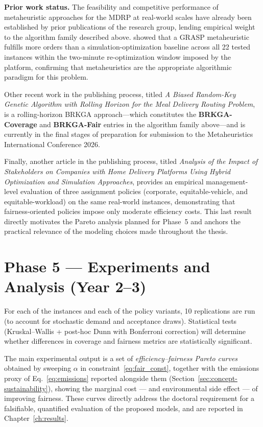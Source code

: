 \documentclass[12pt,a4paper]{report}
\begin{document}
\medskip
\noindent\textbf{Prior work status.} The feasibility and competitive performance of metaheuristic approaches for the MDRP at real-world scales have already been established by prior publications of the research group, lending empirical weight to the algorithm family described above. \citet{giraldo2024grasp} showed that a GRASP metaheuristic fulfills more orders than a simulation-optimization baseline across all 22 tested instances within the
two-minute re-optimization window imposed by the platform, confirming that metaheuristics are the appropriate algorithmic paradigm for this problem.

Other recent work in the publishing process, titled \emph{A Biased Random-Key Genetic Algorithm with Rolling Horizon for the Meal Delivery Routing Problem}, is a rolling-horizon BRKGA approach---which constitutes the \textbf{BRKGA-Coverage} and \textbf{BRKGA-Fair} entries in the algorithm family above---and is currently in the final stages of preparation for submission to the Metaheuristics International Conference 2026.

Finally, another article in the publishing process, titled \emph{Analysis of the Impact of Stakeholders on Companies with Home Delivery Platforms Using Hybrid Optimization and Simulation Approaches}, provides an empirical management-level evaluation of three assignment policies (corporate, equitable-vehicle, and equitable-workload) on the same real-world instances, demonstrating that fairness-oriented policies impose only moderate efficiency costs. This last result directly motivates the Pareto analysis planned for Phase~5 and anchors the practical relevance of the modeling choices made throughout the thesis.

\section{Phase 5 --- Experiments and Analysis (Year 2--3)}
\label{sec:phase5}

For each of the instances and each of the policy variants, 10 replications are run (to account for stochastic demand and acceptance draws). Statistical tests (Kruskal--Wallis + post-hoc Dunn with Bonferroni correction) will determine whether differences in coverage and fairness metrics are statistically significant.

The main experimental output is a set of \emph{efficiency--fairness Pareto curves} obtained by sweeping $\alpha$ in constraint~\eqref{eq:fair_const}, together with the emissions proxy of Eq.~\eqref{eq:emissions} reported alongside them (Section~\ref{sec:concept-sustainability}), showing the marginal cost --- and environmental side effect --- of improving fairness. These curves directly address the doctoral requirement for a falsifiable, quantified evaluation of the proposed models, and are reported in Chapter~\ref{ch:results}.
\end{document}
